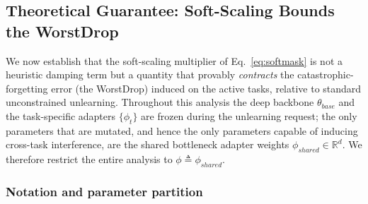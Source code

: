 %
%

\subsection{Theoretical Guarantee: Soft-Scaling Bounds the WorstDrop}
\label{subsec:theory}

We now establish that the soft-scaling multiplier of
Eq.~\eqref{eq:softmask} is not a heuristic damping term but a
quantity that provably \emph{contracts} the catastrophic-forgetting
error (the WorstDrop) induced on the active tasks, relative to
standard unconstrained unlearning. Throughout this analysis the deep
backbone $\theta_{base}$ and the task-specific adapters
$\{\phi_{t}\}$ are frozen during the unlearning request; the only
parameters that are mutated, and hence the only parameters capable of
inducing cross-task interference, are the shared bottleneck adapter
weights $\phi_{shared}\in\mathbb{R}^{d}$. We therefore restrict the
entire analysis to $\phi \triangleq \phi_{shared}$.

\subsubsection*{Notation and parameter partition}

